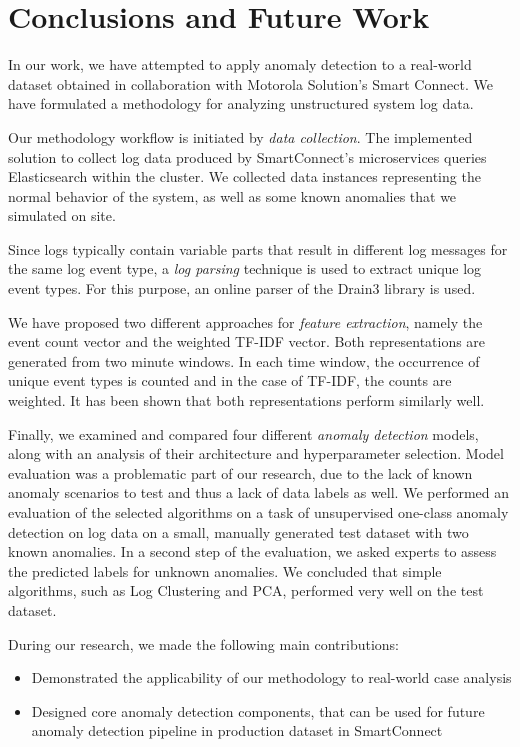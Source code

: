 \chapter{Conclusions and Future Work}
\label{conclusion}
In our work, we have attempted to apply anomaly detection to a real-world dataset obtained in collaboration with Motorola Solution's Smart Connect. We have formulated a methodology for analyzing unstructured system log data. 

Our methodology workflow is initiated by \textit{data collection}. The implemented solution to collect log data produced by SmartConnect's microservices queries Elasticsearch within the cluster. We collected data instances representing the normal behavior of the system, as well as some known anomalies that we simulated on site.

Since logs typically contain variable parts that result in different log messages for the same log event type, a \textit{log parsing} technique is used to extract unique log event types. For this purpose, an online parser of the Drain3 library is used. 

We have proposed two different approaches for \textit{feature extraction}, namely the event count vector and the weighted TF-IDF vector. Both representations are generated from two minute windows. In each time window, the occurrence of unique event types is counted and in the case of TF-IDF, the counts are weighted. It has been shown that both representations perform similarly well.

Finally, we examined and compared four different \textit{anomaly detection} models, along with an analysis of their architecture and hyperparameter selection. Model evaluation was a problematic part of our research, due to the lack of known anomaly scenarios to test and thus a lack of data labels as well. We performed an evaluation of the selected algorithms on a task of unsupervised one-class anomaly detection on log data on a small, manually generated test dataset with two known anomalies. In a second step of the evaluation, we asked experts to assess the predicted labels for unknown anomalies. We concluded that simple algorithms, such as Log Clustering and PCA, performed very well on the test dataset.

During our research, we made the following main contributions:

\begin{itemize}
    \item Demonstrated the applicability of our methodology to real-world case analysis
    \item Designed core anomaly detection components, that can be used for future anomaly detection pipeline in production dataset in SmartConnect
\end{itemize}

